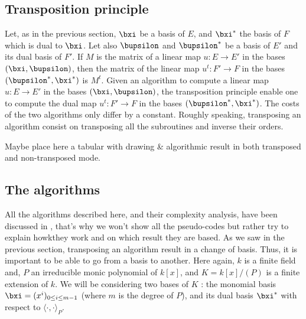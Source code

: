 \documentclass[a4paper,11pt]{article}
\theoremstyle{break}
\theoremstyle{definition}
\theoremstyle{remark}
\newcommand{\ps}[2]{\langle#1,#2\rangle}
\newcommand{\psdot}{\ps{\cdot}{\cdot}}
\begin{document}
\subsection{Transposition principle}
Let, as in the previous section, $\bxi$ be a basis of $E$, and $\bxi^*$ the
basis of $F$ which is dual to $\bxi$. Let also $\bupsilon$ and $\bupsilon^*$ be 
a
basis of $E'$ and its dual basis of $F'$. If $M$ is the matrix of a linear map
$u:E\rightarrow E'$ in the
bases $(\bxi,\bupsilon)$, then the matrix of the linear map $u^t:F'\rightarrow 
F$ in the bases
$(\bupsilon^*,\bxi^*)$ is $M^t$. Given an algorithm to compute a linear map
$u:E\rightarrow E'$ in the bases $(\bxi,\bupsilon)$, the transposition principle
enable one to compute the dual map $u^t:F'\rightarrow F$ in the bases
$(\bupsilon^*,\bxi^*)$. The costs of the two algorithms only differ by a
constant. Roughly speaking, transposing an algorithm consist on transposing all
the subroutines and inverse their orders.
\begin{center}
  Maybe place here a tabular with drawing \& algorithmic result in both
  transposed and non-transposed mode. 
\end{center}
\subsection{The algorithms}
\label{sec-algo}
All the algorithms described here, and their complexity analysis, have been
discussed in \cite{DDS14}, that's why we won't show all the pseudo-codes but
rather try to explain howkthey work and on which result they are based.
As we saw in the previous section, transposing an algorithm result in a change
of basis. Thus, it is important to be able to go from a basis to another. Here
again, $k$ is a finite field and, $P$ an irreducible monic polynomial of $k[x]$, 
and
$K=k[x]/(P)$ is a finite extension of $k$. We will be considering two bases of
$K$ : the monomial basis $\bxi=(x^i)_{0\leq i \leq m-1}$ (where $m$ is the
degree of $P$), and its dual basis $\bxi^*$ with respect to $\psdot_P$.
\end{document}
